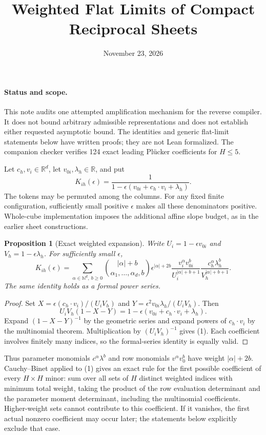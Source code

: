 \documentclass[11pt]{article}
\title{Weighted Flat Limits of Compact Reciprocal Sheets}
\author{}
\date{November 23, 2026}
\newtheorem{proposition}{Proposition}
\begin{document}
\maketitle

\paragraph{Status and scope.}
This note audits one attempted amplification mechanism for the reverse
compiler. It does not bound arbitrary admissible representations and
does not establish either requested asymptotic bound. The identities
and generic flat-limit statements below have written proofs; they are
not Lean formalized. The companion checker verifies 124 exact leading
Pl\"ucker coefficients for $H\leq5$.

Let $c_h,v_i\in\mathbb R^d$, let $v_{0i},\lambda_h\in\mathbb R$, and put
\[
 K_{ih}(\epsilon)=
 \frac1{1-\epsilon(v_{0i}+c_h\cdot v_i+\lambda_h)}.
\]
The tokens may be permuted among the columns. For any fixed finite
configuration, sufficiently small positive $\epsilon$ makes all these
denominators positive. Whole-cube implementation imposes the additional
affine slope budget, as in the earlier sheet constructions.

\begin{proposition}[Exact weighted expansion]
Write $U_i=1-\epsilon v_{0i}$ and $V_h=1-\epsilon\lambda_h$.
For sufficiently small $\epsilon$,
\[
 K_{ih}(\epsilon)=
 \sum_{\alpha\in\mathbb N^d,\ b\geq0}
 \binom{|\alpha|+b}{\alpha_1,\ldots,\alpha_d,b}
 \epsilon^{|\alpha|+2b}
 \frac{v_i^\alpha v_{0i}^b}{U_i^{|\alpha|+b+1}}
 \frac{c_h^\alpha\lambda_h^b}{V_h^{|\alpha|+b+1}}.
 \tag{1}
\]
The same identity holds as a formal power series.
\end{proposition}
\begin{proof}
Set $X=\epsilon(c_h\cdot v_i)/(U_iV_h)$ and
$Y=\epsilon^2v_{0i}\lambda_h/(U_iV_h)$. Then
\[
 U_iV_h(1-X-Y)
       =1-\epsilon(v_{0i}+c_h\cdot v_i+\lambda_h).
\]
Expand $(1-X-Y)^{-1}$ by the geometric series and expand powers of
$c_h\cdot v_i$ by the multinomial theorem. Multiplication by
$(U_iV_h)^{-1}$ gives (1). Each coefficient involves finitely many
indices, so the formal-series identity is equally valid.
\end{proof}

Thus parameter monomials $c^\alpha\lambda^b$ and row monomials
$v^\alpha v_0^b$ have weight $|\alpha|+2b$. Cauchy--Binet applied to
(1) gives an exact rule for the first possible coefficient of every
$H\times H$ minor: sum over all sets of $H$ distinct weighted indices
with minimum total weight, taking the product of the row evaluation
determinant and the parameter moment determinant, including the
multinomial coefficients. Higher-weight sets cannot contribute to
this coefficient. If it vanishes, the first actual nonzero coefficient
may occur later; the statements below explicitly exclude that case.
\end{document}
